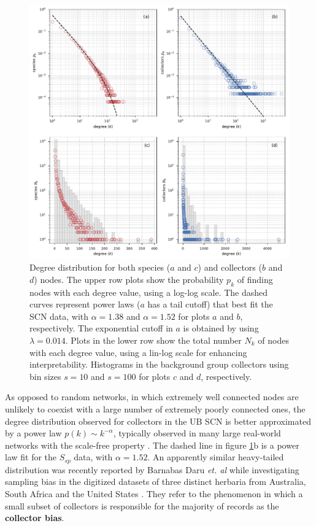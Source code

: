   \begin{figure}[t]
  	\centering
    \includegraphics[width=\linewidth]{figures/casestudy_ub/scn_degree_dist}
    \caption{Degree distribution for both species ($a$ and $c$) and collectors ($b$ and $d$) nodes. The upper row plots show the probability $p_k$ of finding nodes with each degree value, using a log-log scale. The dashed curves represent power laws ($a$ has a tail cutoff) that best fit the SCN data, with $\alpha=1.38$ and $\alpha=1.52$ for plots $a$ and $b$, respectively. The exponential cutoff in $a$ is obtained by using $\lambda=0.014$. Plots in the lower row show the total number $N_k$ of nodes with each degree value, using a lin-log scale for enhancing interpretability. Histograms in the background group collectors using bin sizes $s=10$ and $s=100$ for plots $c$ and $d$, respectively.}
    \label{fig:ub_scn_degree_dist}
  \end{figure}

As opposed to random networks, in which extremely well connected nodes are unlikely to coexist with a large number of extremely poorly connected ones, the degree distribution observed for collectors in the UB SCN is better approximated by a power law $p(k) \sim k^{-\alpha}$, typically observed in many large real-world networks with the scale-free property \cite{Barabasi1999a}. 
The dashed line in figure \ref{fig:ub_scn_degree_dist}b is a power law fit for the $S_{sp}$ data, with $\alpha=1.52$. 
An apparently similar heavy-tailed distribution was recently reported by Barnabas Daru \textit{et. al} while investigating sampling bias in the digitized datasets of three distinct herbaria from Australia, South Africa and the United States \cite{Daru2017}.
They refer to the phenomenon in which a small subset of collectors is responsible for the majority of records as the \textbf{collector bias}.
  
